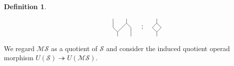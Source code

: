 \documentclass{amsart}
\renewcommand{\S}{\mathcal{S}}
\newcommand{\MS}{\mathcal{MS}}
\theoremstyle{definition}
\newtheorem{definition}[theorem]{Definition}
\begin{document}
\begin{definition}
\begin{equation*}
{\begin{tikzpicture}[scale=.23]
				\draw (10,4)--(10,2)--(11,1)--(11,0);
				\draw (13,4)--(13,3)--(11,1);
				\draw (13,3)--(14,2)--(14,0);
				
				\node at (4.8,4.2){};
				\node at (15.3,-.2){};
				\end{tikzpicture}
				\begin{tikzpicture}[scale=.23]
				\node at (-2,2){; \ };
				\draw (1,4)--(1,3)--(0,2)--(1,1)--(1,0);
				\draw (1,3)--(2,2)--(1,1);
				
				\node at (2.2,4.2){};
				\node at(2.2,-.2){};
				\end{tikzpicture}}
		\end{equation*}	
		We regard $\MS$ as a quotient of $\S$ and consider the induced quotient operad morphism $U(\S) \twoheadrightarrow U(\MS)$.
	\end{definition}
	
\end{document}
